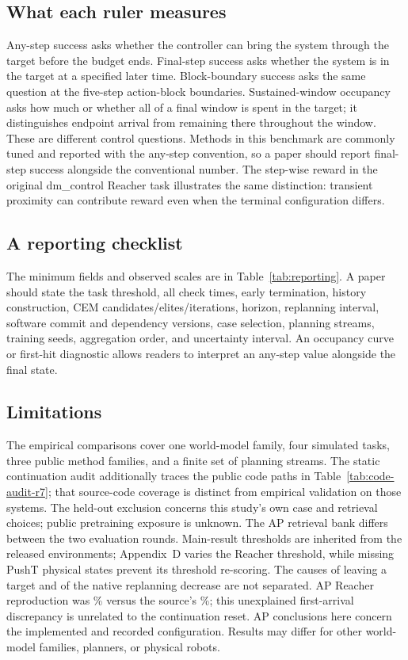 \documentclass[manuscript,screen,review]{jair}
\begin{document}
\subsection{What each ruler measures}
Any-step success asks whether the controller can bring the system through the target before the budget ends. Final-step success asks whether the system is in the target at a specified later time. Block-boundary success asks the same question at the five-step action-block boundaries. Sustained-window occupancy asks how much or whether all of a final window is spent in the target; it distinguishes endpoint arrival from remaining there throughout the window. These are different control questions. Methods in this benchmark are commonly tuned and reported with the any-step convention, so a paper should report final-step success alongside the conventional number. The step-wise reward in the original dm\_control Reacher task illustrates the same distinction: transient proximity can contribute reward even when the terminal configuration differs.

\subsection{A reporting checklist}
The minimum fields and observed scales are in Table~\ref{tab:reporting}. A paper should state the task threshold, all check times, early termination, history construction, CEM candidates/elites/iterations, horizon, replanning interval, software commit and dependency versions, case selection, planning streams, training seeds, aggregation order, and uncertainty interval. An occupancy curve or first-hit diagnostic allows readers to interpret an any-step value alongside the final state.


\subsection{Limitations}
The empirical comparisons cover one world-model family, four simulated tasks, three public method families, and a finite set of planning streams. The static continuation audit additionally traces the public code paths in Table~\ref{tab:code-audit-r7}; that source-code coverage is distinct from empirical validation on those systems. The held-out exclusion concerns this study's own case and retrieval choices; public pretraining exposure is unknown. The AP retrieval bank differs between the two evaluation rounds. Main-result thresholds are inherited from the released environments; Appendix~D varies the Reacher threshold, while missing PushT physical states prevent its threshold re-scoring. The causes of leaving a target and of the native replanning decrease are not separated. AP Reacher reproduction was \ReproAPReacherOur\% versus the source's \ReproAPReacherPaper\%; this unexplained first-arrival discrepancy is unrelated to the continuation reset. AP conclusions here concern the implemented and recorded configuration. Results may differ for other world-model families, planners, or physical robots.
\end{document}
